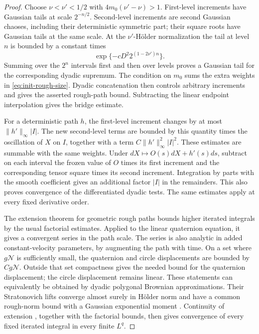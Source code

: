 \begin{proof}
Choose $\nu<\nu'<1/2$ with $4m_0(\nu'-\nu)>1$.  First-level increments
have Gaussian tails at scale $2^{-n/2}$.  Second-level increments are
second Gaussian chaoses, including their deterministic symmetric part;
their square roots have Gaussian tails at the same scale.  At the
$\nu'$-H\"older normalization the tail at level $n$ is bounded by a
constant times
\[
 \exp\{-cD^2 2^{(1-2\nu')n}\}.
\]
Summing over the $2^n$ intervals first and then over levels proves a
Gaussian tail for the corresponding dyadic supremum.  The condition on
$m_0$ sums the extra weights in \eqref{eq:init-rough-size}.  Dyadic
concatenation then controls arbitrary increments and gives the asserted
rough-path bound.  Subtracting the linear endpoint interpolation gives
the bridge estimate.

For a deterministic path $h$, the first-level increment changes by at
most $\|h'\|_\infty|I|$.  The new second-level terms are bounded by this
quantity times the oscillation of $X$ on $I$, together with a term
$C\|h'\|_\infty^2|I|^2$.  These estimates are summable with the same
weights.  Under $dX\mapsto O(s)dX+h'(s)ds$, subtract on each interval the
frozen value of $O$ times its first increment and the corresponding
tensor square times its second increment.  Integration by parts with
the smooth coefficient gives an additional factor $|I|$ in the
remainders.  This also proves convergence of the differentiated dyadic
tests.  The same estimates apply at every fixed derivative order.

The extension theorem for geometric rough paths
\cite[Theorem~2.2.1]{Lyons1998} bounds higher iterated integrals by the
usual factorial estimates.  Applied to the linear
quaternion equation, it gives a convergent series in the path scale.
The series is also analytic in added constant-velocity parameters, by
augmenting the path with time.  On a set where $g\mathcal N$ is sufficiently
small, the quaternion and circle displacements are bounded by
$Cg\mathcal N$.  Outside that set compactness gives the needed bound for
the quaternion displacement; the circle displacement remains linear.
These statements can equivalently be obtained by dyadic polygonal
Brownian approximations.  Their Stratonovich lifts converge almost surely
in H\"older norm and have a common rough-norm bound with a Gaussian
exponential moment
\cite[Propositions~19 and~26, Corollary~27]{FrizVictoir2005}.
Continuity of extension \cite[Theorem~2.2.2]{Lyons1998}, together with
the factorial bounds, then gives convergence of every fixed iterated
integral in every finite $L^q$.


\end{proof}
